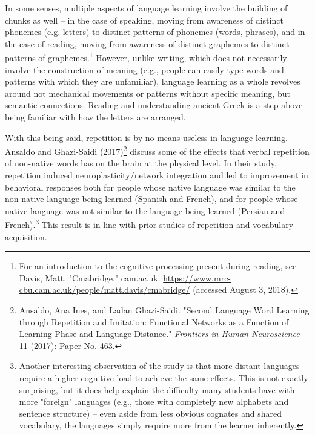 \documentclass[11pt]{article}
\begin{document}
In some senses, multiple aspects of language learning involve the building of chunks as well -- in the case of speaking, moving from awareness of distinct phonemes (e.g. letters) to distinct patterns of phonemes (words, phrases), and in the case of reading, moving from awareness of distinct graphemes to distinct patterns of graphemes.\footnote{For an introduction to the cognitive processing present during reading, see Davis, Matt. "Cmabridge." cam.ac.uk. \url{https://www.mrc-cbu.cam.ac.uk/people/matt.davis/cmabridge/} (accessed August 3, 2018).} However, unlike writing, which does not necessarily involve the construction of meaning (e.g., people can easily type words and patterns with which they are unfamiliar), language learning as a whole revolves around not mechanical movements or patterns without specific meaning, but semantic connections. Reading and understanding ancient Greek is a step above being familiar with how the letters are arranged.

With this being said, repetition is by no means useless in language learning. Ansaldo and Ghazi-Saidi (2017)\footnote{Ansaldo, Ana Ines, and Ladan Ghazi-Saidi. "Second Language Word Learning through Repetition and Imitation: Functional Networks as a Function of Learning Phase and Language Distance." \emph{Frontiers in Human Neuroscience} 11 (2017): Paper No. 463.} discuss some of the effects that verbal repetition of non-native words has on the brain at the physical level. In their study, repetition induced neuroplasticity/network integration and led to improvement in behavioral responses both for people whose native language was similar to the non-native language being learned (Spanish and French), and for people whose native language was not similar to the language being learned (Persian and French).\footnote{Another interesting observation of the study is that more distant languages require a higher cognitive load to achieve the same effects. This is not exactly surprising, but it does help explain the difficulty many students have with more "foreign" languages (e.g., those with completely new alphabets and sentence structure) -- even aside from less obvious cognates and shared vocabulary, the languages simply require more from the learner inherently.} This result is in line with prior studies of repetition and vocabulary acquisition.
\end{document}
